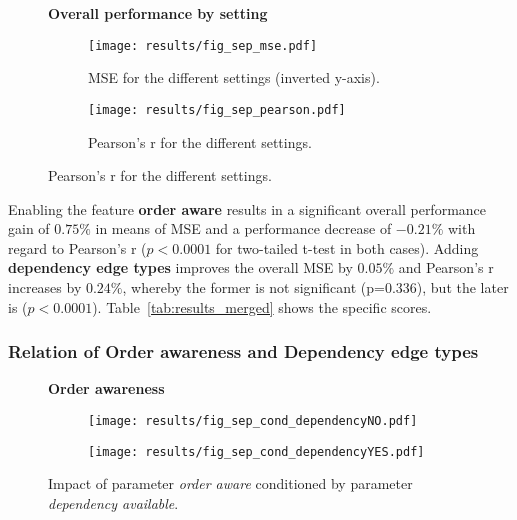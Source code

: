 \begin{figure}[htb!]
  \centering
  \textbf{Overall performance by setting}\par\medskip
  \begin{subfigure}{.5\textwidth}
    \centering
    \texttt{[image: results/fig\_sep\_mse.pdf]}
    \captionsetup{width=0.9\linewidth}
    \caption{MSE for the different settings (inverted y-axis).}
    \label{subfig:res_merged}
  \end{subfigure}%
  \begin{subfigure}{.5\textwidth}
    \centering
    \texttt{[image: results/fig\_sep\_pearson.pdf]}
    \captionsetup{width=0.9\linewidth}
    \caption{Pearson's r for the different settings.}
    \label{subfig:res_sep_mse}
  \end{subfigure}
  \label{fig:res_all}
\end{figure}

Enabling the feature \textbf{order aware} results in a significant overall performance gain of $0.75\%$ in means of \ac{MSE} and a performance decrease of $-0.21\%$ with regard to Pearson's r ($p<0.0001$ for two-tailed t-test  in both cases). Adding \textbf{dependency edge types} improves the overall \ac{MSE} by $0.05\%$ and Pearson's r increases by $0.24\%$, whereby the former is not significant (p=0.336), but the later is ($p<0.0001$). Table~\ref{tab:results_merged} shows the specific scores.


\subsubsection{Relation of Order awareness and Dependency edge types}

\begin{figure}[htb!]
  \centering
  \textbf{Order awareness}\par\medskip
  \begin{subfigure}{.5\textwidth}
    \centering
    \texttt{[image: results/fig\_sep\_cond\_dependencyNO.pdf]}
  \end{subfigure}%
  \begin{subfigure}{.5\textwidth}
    \centering
    \texttt{[image: results/fig\_sep\_cond\_dependencyYES.pdf]}
  \end{subfigure}
  \caption{Impact of parameter \textit{order aware} conditioned by parameter \textit{dependency available}.}
  \label{fig:fig_sep_order}
\end{figure}


